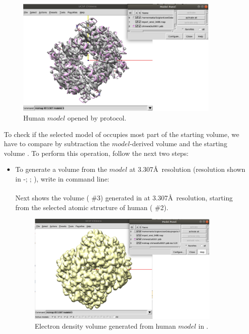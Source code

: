 \begin{itemize}
 \begin{figure}[H]
    \centering 
    \captionsetup{width=.7\linewidth} 
    \includegraphics[width=0.90\textwidth]{Images/Fig42}
    \caption{Human  $model$ opened by \chimera {} protocol.}
    \label{fig:chimera_operate_vol}
   \end{figure}
 
 To check if the selected model of  occupies most part of the starting volume, we have to compare by subtraction the $model$-derived volume and the starting volume . To perform this operation, follow the next two steps:
 
  \begin{itemize}
  
  \item To generate a volume from the $model$ at 3.307\AA\ resolution (resolution shown in \phenix-; ; ), write in \chimera command line:\\
  
  \\
  
  Next  shows the volume ( \#3) generated in \chimera at 3.307\AA\ resolution, starting from the selected atomic structure of human  ( \#2). 
   
  \begin{figure}[H]
    \centering 
    \captionsetup{width=.7\linewidth} 
    \includegraphics[width=0.90\textwidth]{Images/Fig43}
    \caption{Electron density volume generated from human  $model$ in \chimera.}
    \label{fig:chimera_operate_vol_2}
   \end{figure}
  

\end{itemize}
\end{itemize}
